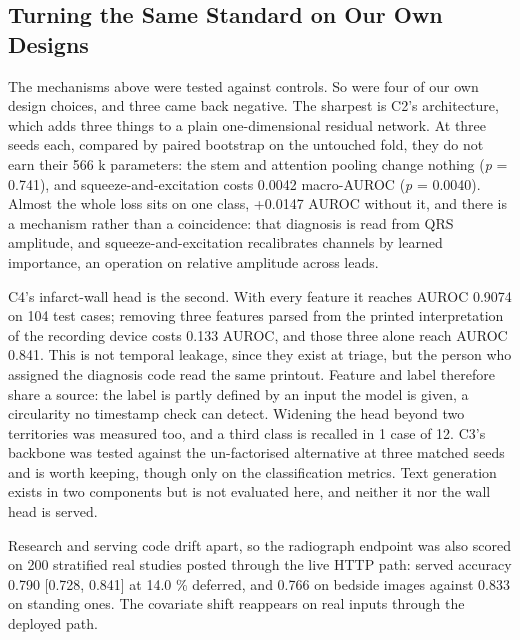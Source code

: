 \documentclass[conference,a4paper]{IEEEtran}
\begin{document}
\subsection{Turning the Same Standard on Our Own Designs}
The mechanisms above were tested against controls. So were four of our own design choices, and three came back negative. The sharpest is C2's architecture, which adds three things to a plain one-dimensional residual network. At three seeds each, compared by paired bootstrap on the untouched fold, they do not earn their 566 k parameters: the stem and attention pooling change nothing (\textit{p} = 0.741), and squeeze-and-excitation costs 0.0042 macro-AUROC (\textit{p} = 0.0040). Almost the whole loss sits on one class, +0.0147 AUROC without it, and there is a mechanism rather than a coincidence: that diagnosis is read from QRS amplitude, and squeeze-and-excitation recalibrates channels by learned importance, an operation on relative amplitude across leads.

C4's infarct-wall head is the second. With every feature it reaches AUROC 0.9074 on 104 test cases; removing three features parsed from the printed interpretation of the recording device costs 0.133 AUROC, and those three alone reach AUROC 0.841. This is not temporal leakage, since they exist at triage, but the person who assigned the diagnosis code read the same printout. Feature and label therefore share a source: the label is partly defined by an input the model is given, a circularity no timestamp check can detect. Widening the head beyond two territories was measured too, and a third class is recalled in 1 case of 12. C3's backbone was tested against the un-factorised alternative at three matched seeds and is worth keeping, though only on the classification metrics. Text generation exists in two components but is not evaluated here, and neither it nor the wall head is served.

Research and serving code drift apart, so the radiograph endpoint was also scored on 200 stratified real studies posted through the live HTTP path: served accuracy 0.790 [0.728, 0.841] at 14.0 \% deferred, and 0.766 on bedside images against 0.833 on standing ones. The covariate shift reappears on real inputs through the deployed path.
\end{document}
